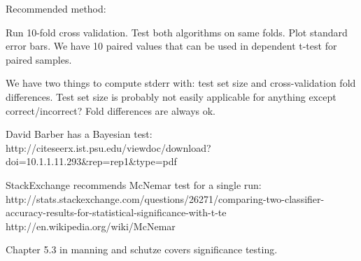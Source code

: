 Recommended method:

Run 10-fold cross validation.
Test both algorithms on same folds.
Plot standard error bars.
We have 10 paired values that can be used in dependent t-test for
paired samples.

We have two things to compute stderr with: test set size and
cross-validation fold differences.  Test set size is probably not
easily applicable for anything except correct/incorrect?  Fold
differences are always ok.

David Barber has a Bayesian test:
http://citeseerx.ist.psu.edu/viewdoc/download?doi=10.1.1.11.293&rep=rep1&type=pdf

StackExchange recommends McNemar test for a single run:
http://stats.stackexchange.com/questions/26271/comparing-two-classifier-accuracy-results-for-statistical-significance-with-t-te
http://en.wikipedia.org/wiki/McNemar%

Chapter 5.3 in manning and schutze covers significance testing.
